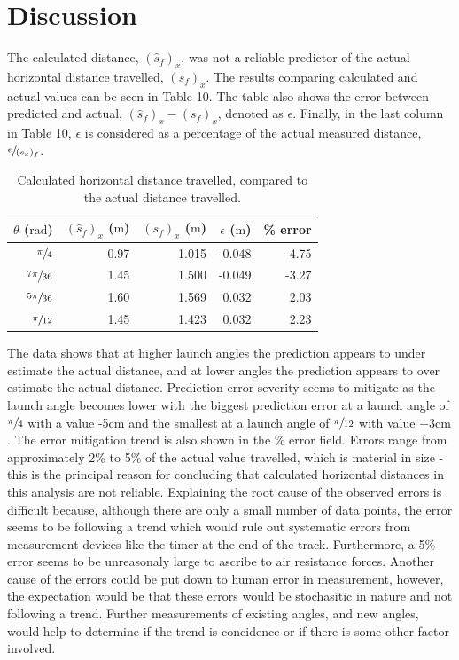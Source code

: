 \documentclass[a4paper]{article}
\begin{document}
\newpage

\section{Discussion}
The calculated distance, $(\hat{s}_f)_x$, was not a reliable predictor of the actual horizontal distance travelled, $(s_f)_x$. The results comparing calculated and actual values can be seen in Table 10. The table also shows the error between predicted and actual, $(\hat{s}_f)_x - (s_f)_x$, denoted as $\epsilon$. Finally, in the last column in Table 10, $\epsilon$ is considered as a percentage of the actual measured distance, $\sfrac{\epsilon}{(s_x)_f}$.

\begin{table}[h]
	\centering
	\caption{Calculated horizontal distance travelled, compared to the actual distance travelled.}
	\begin{tabular}{rrrrr}
		\toprule
		$\theta$ ($\si{\radian}$) &  $(\hat{s}_f)_x$ ($\si{\meter}$) & $(s_f)_x$ ($\si{\meter}$) & $\epsilon$ ($\si{\meter}$) & \% error\\
		\midrule
		$\sfrac{\pi}{4}$ & 0.97 & 1.015 & -0.048 & -4.75 \\
		$\sfrac{7\pi}{36}$ & 1.45 & 1.500 & -0.049 & -3.27 \\
		$\sfrac{5\pi}{36}$ & 1.60 & 1.569 & 0.032 & 2.03 \\
		$\sfrac{\pi}{12}$ & 1.45 & 1.423 & 0.032 & 2.23 \\
		\bottomrule
	\end{tabular}
\end{table}

The data shows that at higher launch angles the prediction appears to under estimate the actual distance, and at lower angles the prediction appears to over estimate the actual distance. Prediction error severity seems to mitigate as the launch angle becomes lower with the biggest prediction error at a launch angle of $\sfrac{\pi}{4}$ with a value -5$\si{\centi\meter}$ and the smallest at a launch angle of $\sfrac{\pi}{12}$ with value +3$\si{\centi\meter}$. The error mitigation trend is also shown in the \% error field. Errors range from approximately 2\% to 5\% of the actual value travelled, which is material in size - this is the principal reason for concluding that calculated horizontal distances in this analysis are not reliable. Explaining the root cause of the observed errors is difficult because, although there are only a small number of data points, the error seems to be following a trend which would rule out systematic errors from measurement devices like the timer at the end of the track. Furthermore, a 5\% error seems to be unreasonaly large to ascribe to air resistance forces. Another cause of the errors could be put down to human error in measurement, however, the expectation would be that these errors would be stochasitic in nature and not following a trend. Further measurements of existing angles, and new angles, would help to determine if the trend is concidence or if there is some other factor involved. \\ 
\end{document}
